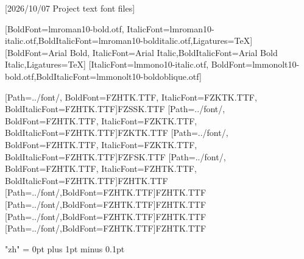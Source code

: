 
[2026/10/07 Project text font files]

\setmainfont{lmroman10-regular.otf}[BoldFont=lmroman10-bold.otf,
  ItalicFont=lmroman10-italic.otf,BoldItalicFont=lmroman10-bolditalic.otf,Ligatures=TeX]
\setsansfont{Arial}[BoldFont={Arial Bold},
  ItalicFont={Arial Italic},BoldItalicFont={Arial Bold Italic},Ligatures=TeX]
\setmonofont{lmmono10-regular.otf}[ItalicFont=lmmono10-italic.otf,
  BoldFont=lmmonolt10-bold.otf,BoldItalicFont=lmmonolt10-boldoblique.otf]


[Path=../font/,
  BoldFont=FZHTK.TTF, ItalicFont=FZKTK.TTF,
  BoldItalicFont=FZHTK.TTF]{FZSSK.TTF}
[Path=../font/,
  BoldFont=FZHTK.TTF, ItalicFont=FZKTK.TTF,
  BoldItalicFont=FZHTK.TTF]{FZKTK.TTF}
[Path=../font/,
  BoldFont=FZHTK.TTF, ItalicFont=FZKTK.TTF,
  BoldItalicFont=FZHTK.TTF]{FZFSK.TTF}
[Path=../font/,
  BoldFont=FZHTK.TTF, ItalicFont=FZHTK.TTF,
  BoldItalicFont=FZHTK.TTF]{FZHTK.TTF}
[Path=../font/,BoldFont=FZHTK.TTF]{FZHTK.TTF}
[Path=../font/,BoldFont=FZHTK.TTF]{FZHTK.TTF}
[Path=../font/,BoldFont=FZHTK.TTF]{FZHTK.TTF}
[Path=../font/,BoldFont=FZHTK.TTF]{FZHTK.TTF}


\XeTeXlinebreaklocale "zh"
\XeTeXlinebreakskip = 0pt plus 1pt minus 0.1pt

\newcommand\kaishu{\CJKfamily{kai}} %
\newcommand\songti{\CJKfamily{song}} %
\newcommand\heiti{\CJKfamily{hei}}	%
\newcommand\thmheiti{\CJKfamily{hei2}}	%
\newcommand\fangsong{\CJKfamily{fangsong}} %
\renewcommand{\em}{\bfseries\CJKfamily{emfont}} %